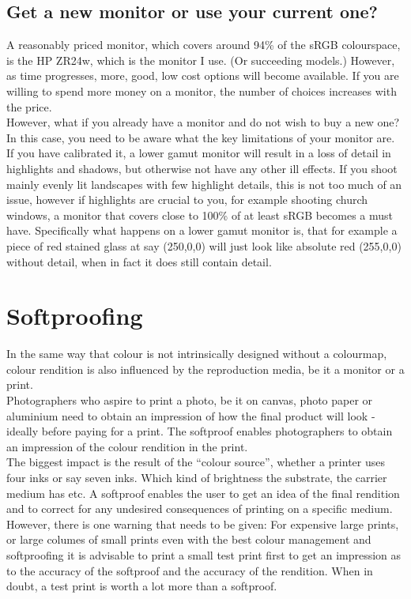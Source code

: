 \subsection{Get a new monitor or use your current one?}

A reasonably priced monitor, which covers around 94\% of the sRGB \gls{colourspace}, is the HP ZR24w, which is the monitor I use. (Or succeeding models.) However, as time progresses, more, good, low cost options will become available. If you are willing to spend more money on a monitor, the number of choices increases with the price.
\\[\baselineskip]
However, what if you already have a monitor and do not wish to buy a new one?
\\
In this case, you need to be aware what the key limitations of your monitor are. If you have calibrated it, a lower gamut monitor will result in a loss of detail in highlights and shadows, but otherwise not have any other ill effects. If you shoot mainly evenly lit landscapes with few highlight details, this is not too much of an issue, however if highlights are crucial to you, for example shooting church windows, a monitor that covers close to 100\% of at least sRGB becomes a must have. Specifically what happens on a lower gamut monitor is, that for example a piece of red stained glass at say (250,0,0) will just look like absolute red (255,0,0) without detail, when in fact it does still contain detail.


\section{Softproofing}

In the same way that colour is not intrinsically designed without a colourmap, colour rendition is also influenced by the reproduction media, be it a monitor or a print.
\\[\baselineskip]
Photographers who aspire to print a photo, be it on canvas, photo paper or aluminium need to obtain an impression of how the final product will look - ideally before paying for a print. The softproof enables photographers to obtain an impression of the colour rendition in the print.
\\[\baselineskip]
The biggest impact is the result of the ``colour source'', whether a printer uses four inks or say seven inks. Which kind of brightness the substrate, the carrier medium has etc.
A softproof enables the user to get an idea of the final rendition and to correct for any undesired consequences of printing on a specific medium.
\\[\baselineskip]
However, there is one warning that needs to be given: For expensive large prints, or large columes of small prints even with the best colour management and softproofing it is advisable to print a small test print first to get an impression as to the accuracy of the softproof and the accuracy of the rendition.
When in doubt, a test print is worth a lot more than a softproof.




